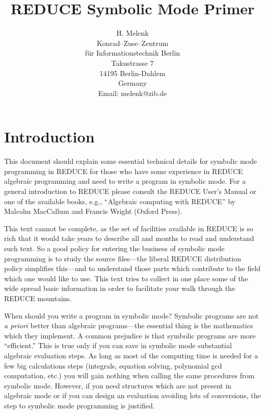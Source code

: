 \documentclass[11pt]{article}
\title{REDUCE Symbolic Mode Primer}
\date{}
\author{
H. Melenk\\[0.05in]
Konrad--Zuse--Zentrum\\
f\"ur Informationstechnik Berlin\\
Takustrasse 7\\
14195 Berlin-Dahlem\\
Germany\\[0.05in]
Email: melenk@zib.de\\[0.05in]}
\newcommand{\reduce}{\small REDUCE}
\begin{document}
\maketitle

\section{Introduction}

This document should explain some essential technical details for
symbolic mode programming in {\reduce} for those who
have some experience in {\reduce} algebraic programming
and need to write a program in symbolic mode. For a general
introduction to {\reduce} please consult the {\reduce} User's
Manual or one of the available books, e.g.,  ``Algebraic
computing with REDUCE'' by Malcolm MacCallum and Francis
Wright (Oxford Press).

This text cannot be complete, as the set of facilities
available in {\reduce} is so rich that it would take years
to describe all and months to read and understand such text.
So a good policy for entering the business of symbolic mode
programming is to study the source files---the
liberal {\reduce} distribution policy simplifies this---and
to understand those parts which contribute to the
field which one would like to use. This text tries to
collect in one place some of the wide spread basic information
in order to facilitate your walk through the {\reduce} mountains.

When should you write a program in symbolic mode?
Symbolic programs are not \textit{a priori} better than algebraic
programs---the essential thing is the mathematics which they
implement. A common prejudice is that symbolic programs
are more ``efficient.'' This is true only if you can
save in symbolic mode substantial algebraic evaluation
steps. As long as most of the
computing time is needed for a few big calculations steps
(integrals, equation solving, polynomial gcd computation, etc.)
you will gain nothing when calling the same procedures
from symbolic mode. However, if you need structures
which are not present in algebraic mode or if you
can design an evaluation avoiding lots of conversions,
the step to symbolic mode programming is justified.
\end{document}
